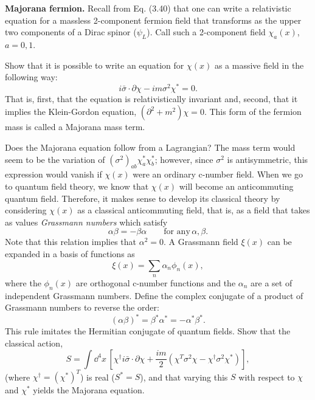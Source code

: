 \problem \textbf{Majorana fermion.} Recall from Eq. (3.40) that one can write a relativistic equation for a massless 2-component fermion field 
that transforms as the upper two components of a Dirac spinor ($\psi_L$). Call such a 2-component field $\chi_a(x)$, $a = 0, 1$.
\begin{problembody}
    \item \label{ex:cp3:majorana_eq} Show that it is possible to write an equation for $\chi(x)$ as a massive field in the following way:
    \begin{equation}\label{equ:cp3:majorana_eq}
        i\bar{\sigma}\cdot\partial\chi - im\sigma^2\chi^\ast = 0.
    \end{equation}
    That is, first, that the equation is relativistically invariant and, second, that it implies the Klein-Gordon equation, $(\partial^2 + m^2)\chi = 0$.
    This form of the fermion mass is called a Majorana mass term.

    \item \label{ex:cp3:majorana_lag} Does the Majorana equation follow from a Lagrangian? The mass term would seem to be the variation of $(\sigma^2)_{ab} \chi_a^\ast \chi_b^\ast$; 
    however, since $\sigma^2$ is antisymmetric, this expression would vanish if $\chi(x)$ were an ordinary c-number field. When we go to quantum field theory,
    we know that $\chi(x)$ will become an anticommuting quantum field. Therefore, it makes sense to develop its classical theory by considering $\chi(x)$ as 
    a classical anticommuting field, that is, as a field that takes as values \textit{Grassmann numbers} which satisfy
    \begin{equation*}
        \alpha \beta = -\beta \alpha \qquad \text{for any} \, \alpha, \beta.
    \end{equation*}
    Note that this relation implies that $\alpha^2 = 0$. A Grassmann field $\xi(x)$ can be expanded in a basis of functions as
    \begin{equation*}
        \xi(x) = \sum_n \alpha_n \phi_n(x),
    \end{equation*}
    where the $\phi_n(x)$ are orthogonal c-number functions and the $\alpha_n$ are a set of independent Grassmann numbers. Define the complex conjugate of a 
    product of Grassmann numbers to reverse the order:
    \begin{equation*}
        (\alpha\beta)^\ast = \beta^\ast \alpha^\ast = -\alpha^\ast \beta^\ast.
    \end{equation*}
    This rule imitates the Hermitian conjugate of quantum fields. Show that the classical action,
    \begin{equation}\label{equ:cp3:majorana_action}
        S = \int \dd^4x \, \left[\chi^\dagger i\bar{\sigma}\cdot\partial\chi + \frac{im}{2}\left(\chi^T\sigma^2\chi - \chi^\dagger\sigma^2\chi^\ast\right)\right],
    \end{equation}
    (where $\chi^\dagger = (\chi^\ast)^T$) is real ($S^\ast = S$), and that varying this $S$ with respect to $\chi$ and $\chi^\ast$ yields the Majorana equation.


\end{problembody}
